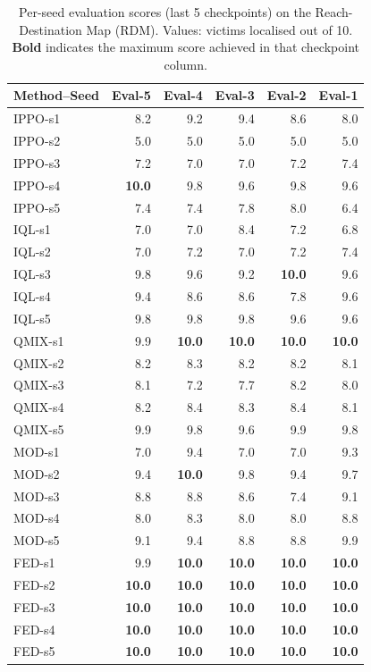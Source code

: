 \begin{table}[t]
\centering
\caption{Per-seed evaluation scores (last 5 checkpoints) on the Reach-Destination Map (RDM). Values: victims localised out of 10. \textbf{Bold} indicates the maximum score achieved in that checkpoint column.}
\label{tab:seed_rdm}
\small
\begin{tabular}{lrrrrr}
\toprule
Method--Seed & Eval-5 & Eval-4 & Eval-3 & Eval-2 & Eval-1 \\
\midrule
IPPO-s1 & 8.2 & 9.2 & 9.4 & 8.6 & 8.0 \\
IPPO-s2 & 5.0 & 5.0 & 5.0 & 5.0 & 5.0 \\
IPPO-s3 & 7.2 & 7.0 & 7.0 & 7.2 & 7.4 \\
IPPO-s4 & \textbf{10.0} & 9.8 & 9.6 & 9.8 & 9.6 \\
IPPO-s5 & 7.4 & 7.4 & 7.8 & 8.0 & 6.4 \\
\midrule
IQL-s1 & 7.0 & 7.0 & 8.4 & 7.2 & 6.8 \\
IQL-s2 & 7.0 & 7.2 & 7.0 & 7.2 & 7.4 \\
IQL-s3 & 9.8 & 9.6 & 9.2 & \textbf{10.0} & 9.6 \\
IQL-s4 & 9.4 & 8.6 & 8.6 & 7.8 & 9.6 \\
IQL-s5 & 9.8 & 9.8 & 9.8 & 9.6 & 9.6 \\
\midrule
QMIX-s1 & 9.9 & \textbf{10.0} & \textbf{10.0} & \textbf{10.0} & \textbf{10.0} \\
QMIX-s2 & 8.2 & 8.3 & 8.2 & 8.2 & 8.1 \\
QMIX-s3 & 8.1 & 7.2 & 7.7 & 8.2 & 8.0 \\
QMIX-s4 & 8.2 & 8.4 & 8.3 & 8.4 & 8.1 \\
QMIX-s5 & 9.9 & 9.8 & 9.6 & 9.9 & 9.8 \\
\midrule
MOD-s1 & 7.0 & 9.4 & 7.0 & 7.0 & 9.3 \\
MOD-s2 & 9.4 & \textbf{10.0} & 9.8 & 9.4 & 9.7 \\
MOD-s3 & 8.8 & 8.8 & 8.6 & 7.4 & 9.1 \\
MOD-s4 & 8.0 & 8.3 & 8.0 & 8.0 & 8.8 \\
MOD-s5 & 9.1 & 9.4 & 8.8 & 8.8 & 9.9 \\
\midrule
FED-s1 & 9.9 & \textbf{10.0} & \textbf{10.0} & \textbf{10.0} & \textbf{10.0} \\
FED-s2 & \textbf{10.0} & \textbf{10.0} & \textbf{10.0} & \textbf{10.0} & \textbf{10.0} \\
FED-s3 & \textbf{10.0} & \textbf{10.0} & \textbf{10.0} & \textbf{10.0} & \textbf{10.0} \\
FED-s4 & \textbf{10.0} & \textbf{10.0} & \textbf{10.0} & \textbf{10.0} & \textbf{10.0} \\
FED-s5 & \textbf{10.0} & \textbf{10.0} & \textbf{10.0} & \textbf{10.0} & \textbf{10.0} \\
\bottomrule
\end{tabular}
\end{table}
